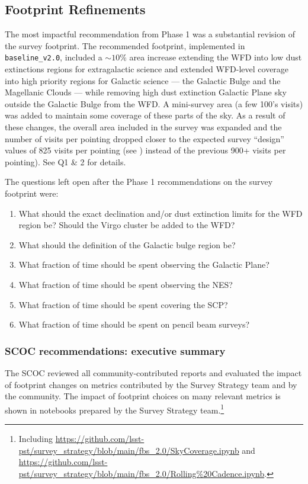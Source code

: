 \subsection{Footprint Refinements}\label{q:Footprint} 

The most impactful recommendation from Phase 1 was a substantial revision of the survey footprint. The recommended footprint, implemented in \texttt{baseline\_v2.0}, included a $\sim10\%$ area increase extending the WFD into low dust extinctions regions for extragalactic science and extended WFD-level coverage into high priority regions for Galactic science --- the Galactic Bulge and the Magellanic Clouds --- while removing high dust extinction Galactic Plane sky outside the Galactic Bulge from the WFD. A mini-survey area (a few 100's visits) was added to maintain some coverage of these parts of the sky. As a result of these changes, the overall area included in the survey was expanded and the number of visits per pointing dropped closer to the expected survey ``design'' values of 825 visits per pointing (see \citealt{LPM-17}) instead of the previous 900+ visits per pointing). See  Q1 \& 2 for details. 

The questions left open after the Phase 1 recommendations on the survey footprint were: 

\begin{enumerate}
\item What should the exact declination and/or dust extinction limits for the WFD region be? Should the Virgo cluster be added to the WFD?
\item What should the definition of the Galactic bulge region be? 
\item What fraction of time should be spent observing the Galactic Plane?
\item What fraction of time should be spent observing the NES?
\item What fraction of time should be spent covering the SCP?
\item What fraction of time should be spent on pencil beam surveys?
\end{enumerate}

\subsubsection{SCOC recommendations: executive summary}\label{rec:footprint_es}

 The SCOC reviewed all community-contributed reports and evaluated the impact of footprint changes on metrics contributed by the Survey Strategy team and by the community. The impact of footprint choices on many relevant metrics is shown in notebooks prepared by the Survey Strategy team.\footnote{Including \url{https://github.com/lsst-pst/survey_strategy/blob/main/fbs_2.0/SkyCoverage.ipynb} and \url{https://github.com/lsst-pst/survey_strategy/blob/main/fbs_2.0/Rolling\%20Cadence.ipynb}.}

